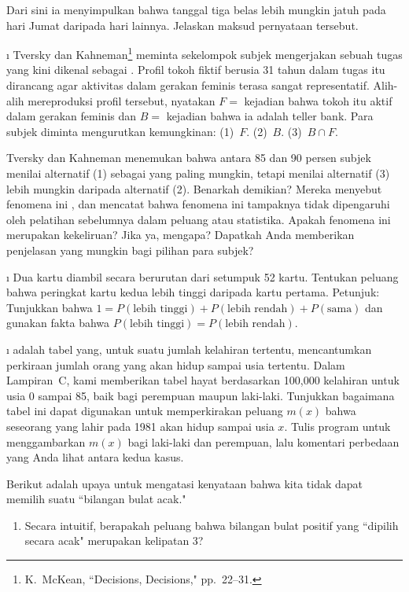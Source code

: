 \begin{LJSItem}
\noindent Dari sini ia menyimpulkan bahwa tanggal tiga belas lebih mungkin jatuh pada
hari Jumat daripada hari lainnya.  Jelaskan maksud pernyataan tersebut.

\i\label{exer 1.2.24} Tversky dan Kahneman\footnote{K.~McKean, ``Decisions,
Decisions," pp.~22--31.} meminta sekelompok subjek mengerjakan sebuah tugas yang kini dikenal
sebagai . Profil tokoh fiktif berusia 31 tahun dalam
tugas itu dirancang agar aktivitas dalam gerakan feminis terasa sangat representatif. Alih-alih
mereproduksi profil tersebut, nyatakan
$F=$ kejadian bahwa tokoh itu aktif dalam gerakan feminis dan $B=$ kejadian bahwa ia adalah teller bank.
Para subjek diminta mengurutkan kemungkinan:
\hfill\break
\indent(1)~$F$.\hfill\break
\indent(2)~$B$.\hfill\break
\indent(3)~$B\cap F$.\hfill\break

\noindent Tversky dan Kahneman menemukan bahwa 
antara 85 dan 90 persen subjek menilai
alternatif (1) sebagai yang paling mungkin, tetapi menilai alternatif (3) lebih mungkin daripada alternatif
(2).  Benarkah demikian?  Mereka menyebut fenomena ini , dan
mencatat bahwa fenomena ini tampaknya tidak dipengaruhi oleh pelatihan sebelumnya dalam peluang atau
statistika.  Apakah fenomena ini merupakan kekeliruan?  Jika ya, mengapa? Dapatkah Anda memberikan
penjelasan yang mungkin bagi pilihan para subjek?

\i\label{exer 1.2.25} Dua kartu diambil secara berurutan dari setumpuk 52
kartu.  Tentukan
peluang bahwa peringkat kartu kedua lebih tinggi daripada kartu pertama.  \emx
{Petunjuk}: Tunjukkan bahwa $1 = P(\mbox{lebih tinggi}) + P(\mbox{lebih rendah}) + P(\mbox{sama})$
dan gunakan fakta bahwa $P(\mbox{lebih tinggi}) = P(\mbox{lebih rendah})$.

\i\label{exer 1.2.26}  adalah tabel yang, untuk suatu
jumlah kelahiran tertentu, mencantumkan perkiraan jumlah orang yang akan hidup sampai
usia tertentu.  Dalam Lampiran~C, kami memberikan tabel hayat berdasarkan 100{,}000
kelahiran untuk usia 0 sampai 85, baik bagi perempuan maupun laki-laki.  Tunjukkan bagaimana 
tabel ini dapat digunakan untuk memperkirakan peluang $m(x)$ bahwa seseorang yang lahir pada 1981 
akan hidup sampai usia $x$.  Tulis program untuk menggambarkan $m(x)$ bagi laki-laki dan perempuan, 
lalu komentari perbedaan yang Anda lihat antara kedua kasus.

\istar\label{exer 1.2.27} Berikut adalah upaya untuk mengatasi kenyataan bahwa kita
tidak dapat 
memilih suatu ``bilangan bulat acak."
\begin{enumerate}
\item Secara intuitif, berapakah peluang bahwa bilangan bulat positif yang
``dipilih secara acak" merupakan kelipatan 3?


\end{enumerate}
\end{LJSItem}
